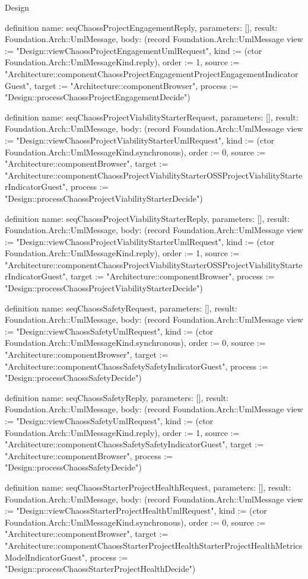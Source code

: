 \begin{lexlean}{Design}
\begin{semanticmodule}
definition{
  name: seqChaossProjectEngagementReply,
  parameters: [],
  result: Foundation.Arch::UmlMessage,
  body: (record Foundation.Arch::UmlMessage {view := "Design::viewChaossProjectEngagementUmlRequest", kind := (ctor Foundation.Arch::UmlMessageKind.reply), order := 1, source := "Architecture::componentChaossProjectEngagementProjectEngagementIndicatorGuest", target := "Architecture::componentBrowser", process := "Design::processChaossProjectEngagementDecide"})
}

definition{
  name: seqChaossProjectViabilityStarterRequest,
  parameters: [],
  result: Foundation.Arch::UmlMessage,
  body: (record Foundation.Arch::UmlMessage {view := "Design::viewChaossProjectViabilityStarterUmlRequest", kind := (ctor Foundation.Arch::UmlMessageKind.synchronous), order := 0, source := "Architecture::componentBrowser", target := "Architecture::componentChaossProjectViabilityStarterOSSProjectViabilityStarterIndicatorGuest", process := "Design::processChaossProjectViabilityStarterDecide"})
}

definition{
  name: seqChaossProjectViabilityStarterReply,
  parameters: [],
  result: Foundation.Arch::UmlMessage,
  body: (record Foundation.Arch::UmlMessage {view := "Design::viewChaossProjectViabilityStarterUmlRequest", kind := (ctor Foundation.Arch::UmlMessageKind.reply), order := 1, source := "Architecture::componentChaossProjectViabilityStarterOSSProjectViabilityStarterIndicatorGuest", target := "Architecture::componentBrowser", process := "Design::processChaossProjectViabilityStarterDecide"})
}

definition{
  name: seqChaossSafetyRequest,
  parameters: [],
  result: Foundation.Arch::UmlMessage,
  body: (record Foundation.Arch::UmlMessage {view := "Design::viewChaossSafetyUmlRequest", kind := (ctor Foundation.Arch::UmlMessageKind.synchronous), order := 0, source := "Architecture::componentBrowser", target := "Architecture::componentChaossSafetySafetyIndicatorGuest", process := "Design::processChaossSafetyDecide"})
}

definition{
  name: seqChaossSafetyReply,
  parameters: [],
  result: Foundation.Arch::UmlMessage,
  body: (record Foundation.Arch::UmlMessage {view := "Design::viewChaossSafetyUmlRequest", kind := (ctor Foundation.Arch::UmlMessageKind.reply), order := 1, source := "Architecture::componentChaossSafetySafetyIndicatorGuest", target := "Architecture::componentBrowser", process := "Design::processChaossSafetyDecide"})
}

definition{
  name: seqChaossStarterProjectHealthRequest,
  parameters: [],
  result: Foundation.Arch::UmlMessage,
  body: (record Foundation.Arch::UmlMessage {view := "Design::viewChaossStarterProjectHealthUmlRequest", kind := (ctor Foundation.Arch::UmlMessageKind.synchronous), order := 0, source := "Architecture::componentBrowser", target := "Architecture::componentChaossStarterProjectHealthStarterProjectHealthMetricsModelIndicatorGuest", process := "Design::processChaossStarterProjectHealthDecide"})
}


\end{semanticmodule}
\end{lexlean}

